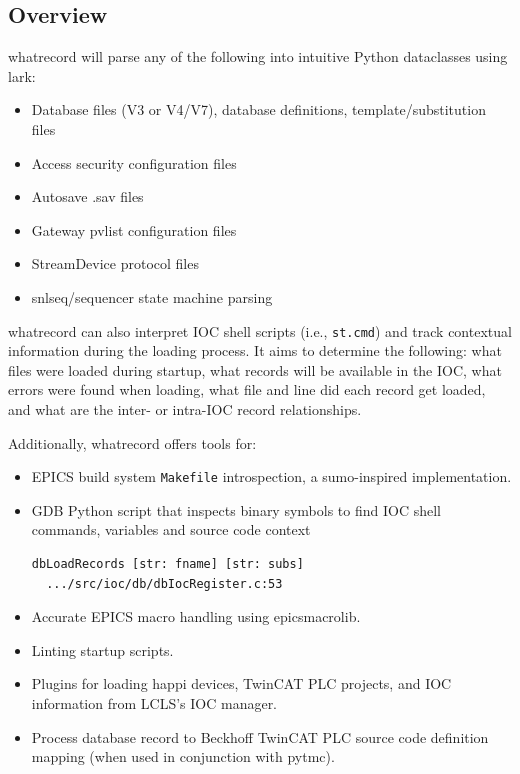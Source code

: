 \documentclass[letter,
               keeplastbox,   %
               ]{jacow}
\begin{document}
\subsection{Overview}
whatrecord will parse any of the following into intuitive Python dataclasses using lark:
\begin{itemize}
  \item Database files (V3 or V4/V7), database definitions, template/substitution files
  \item Access security configuration files
  \item Autosave .sav files
  \item Gateway pvlist configuration files
  \item StreamDevice protocol files
  \item snlseq/sequencer state machine parsing
\end{itemize}

whatrecord can also interpret IOC shell scripts (i.e., \verb_st.cmd_) and track
contextual information during the loading process.  It aims to determine the
following: what files were loaded during startup, what records will
be available in the IOC, what errors were found when loading, what file and
line did each record get loaded, and what are the inter- or intra-IOC record
relationships.

Additionally, whatrecord offers tools for:
\begin{itemize}
  \item EPICS build system \verb_Makefile_ introspection, a sumo\cite{sumo}-inspired
    implementation.
  \item GDB Python script that inspects binary symbols to find IOC shell commands, variables and source code context
    \begin{lstlisting}[language=bash]
  dbLoadRecords [str: fname] [str: subs]
  .../src/ioc/db/dbIocRegister.c:53
    \end{lstlisting}
  \item Accurate EPICS macro handling using epicsmacrolib\cite{epicsmacrolib}.
  \item Linting startup scripts.
  \item Plugins for loading happi devices, TwinCAT PLC projects, and IOC information from LCLS’s IOC manager.
  \item Process database record to Beckhoff TwinCAT PLC source code definition mapping (when used in conjunction with pytmc\cite{pytmc}).
\end{itemize}
\end{document}
